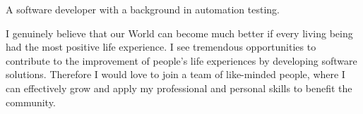 

\begin{cvparagraph}

A software developer with a background in automation testing. 

I genuinely believe that our World can become much better if every living being had the most positive life experience. I see tremendous opportunities to contribute to the improvement of people's life experiences by developing software solutions. Therefore I would love to join a team of like-minded people, where I can effectively grow and apply my professional and personal skills to benefit the community.
\end{cvparagraph}
